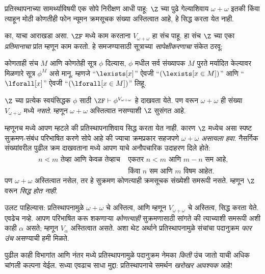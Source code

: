 \documentclass[../../../include/open-logic-section]{subfiles}
\begin{document}

प्रतिस्थापनाच्या सामर्थ्याविषयी एक सोपे निरीक्षण आधी पाहू: $\Z$ च्या पुढे गेल्याशिवाय $\omega + \omega$ इतकी किंवा त्याहून मोठी कोणतीही फोन न्यूमन क्रमसूचक संख्या अस्तित्वात आहे, हे सिद्ध करता येत नाही.

का, याचा आराखडा असा. $\ZF$ मध्ये काम करताना $V_{\omega+\omega}$ हा संच पाहू. हा संच $\Z$ च्या एका \emph{प्रतिमानाचा} प्रांत म्हणून काम करतो. हे समजण्यासाठी सूत्राच्या \emph{सापेक्षीकरणाचा} संकेत ठरवू:
\begin{defn}
	कोणताही संच $M$ आणि कोणतेही सूत्र $\phi$ दिल्यास, $\phi$ मधील सर्व संख्यापक $M$ पुरते मर्यादित केल्यावर मिळणारे सूत्र $\phi^M$ असे मानू. म्हणजे ``$\lexists[x]$'' ऐवजी ``$(\lexists[x \in M])$'' आणि ``$\lforall[x]$'' ऐवजी ``$(\lforall[x \in M])$'' लिहू.
\end{defn}\noindent
$\Z$ च्या प्रत्येक स्वयंसिद्धक $\phi$ साठी $\ZF \vdash
\phi^{V_{\omega+\omega}}$ हे दाखवता येते. पण  वरून $\omega+\omega$ ही संख्या $V_{\omega+\omega}$ मध्ये \emph{नसते}. म्हणून $\omega+\omega$ अस्तित्वात नसण्याशी $\Z$ सुसंगत आहे.

म्हणूनच  मध्ये आपण म्हटले की  प्रतिस्थापनाशिवाय सिद्ध करता येत नाही. कारण $\Z$ मध्येच असा स्पष्ट सुक्रमण-संबंध परिभाषित करणे सोपे आहे की ज्याचा क्रमप्रकार सहजपणे $\omega+\omega$ \emph{असायला हवा}. नैसर्गिक संख्यांवरील पुढील क्रम दाखवताना  मध्ये आपण याचे अनौपचारिक उदाहरण दिले होते:
\begin{align*}
	n \lessdot m \text{ तेव्हा आणि केवळ तेव्हाच }&\text{एकतर }n < m\text{ आणि }m-n\text{ सम आहे,}\\
	& \text{किंवा $n$ सम आणि $m$ विषम आहेत.}
\end{align*}
पण $\omega+\omega$ अस्तित्वात नसेल, तर हे सुक्रमण कोणत्याही क्रमसूचक संख्येशी समरूपी नसते. म्हणून $\Z$ वरून  \emph{सिद्ध होत नाही}.

उलट पाहिल्यास: प्रतिस्थापनामुळे $\omega+\omega$ चे अस्तित्व, आणि म्हणून $V_{\omega+\omega}$ चे अस्तित्व, सिद्ध करता येते. एवढेच नव्हे. आपण परिभाषित करू शकणाऱ्या \emph{कोणत्याही} सुक्रमणासाठी  सांगते की त्याच्याशी समरूपी अशी काही $\alpha$ असते; म्हणून $V_\alpha$ अस्तित्वात असते. अशा थेट अर्थाने प्रतिस्थापनामुळे संचांचा पदानुक्रम \emph{फार उंच} असण्याची हमी मिळते.

पुढील काही विभागांत आणि नंतर  मध्ये प्रतिस्थापनामुळे पदानुक्रम नेमका \emph{किती} उंच जातो याची अधिक चांगली कल्पना येईल. सध्या एवढाच साधा मुद्दा: प्रतिस्थापनाचे समर्थन \emph{खरोखर आवश्यक} आहे!
\end{document}

